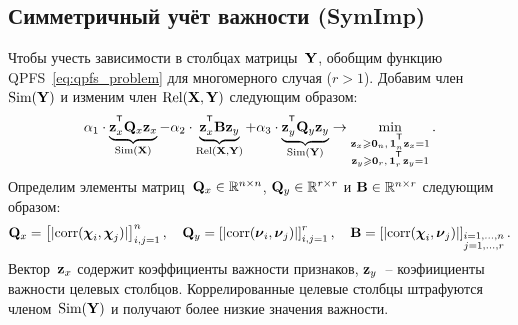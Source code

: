 \subsection{Симметричный учёт важности (SymImp)}
Чтобы учесть зависимости в столбцах матрицы~$\mathbf{Y}$, обобщим функцию QPFS~\eqref{eq:qpfs_problem} для многомерного случая ($r > 1$).
Добавим член~$\text{Sim}(\mathbf{Y})$ и изменим член $\text{Rel}(\mathbf{X}, \mathbf{Y})$ следующим образом:
\begin{equation}
\alpha_1 \cdot \underbrace{\bz_x^{\T} \bQ_x \bz_x}_{\text{Sim}(\bX)} - \alpha_2 \cdot \underbrace{\bz_x^{\T} \bB \bz_y}_{\text{Rel}(\bX, \bY)} + \alpha_3 \cdot \underbrace{\bz_y^{\T} \bQ_y \bz_y}_{\text{Sim}(\bY)} \rightarrow \min_{\substack{\bz_x \geq \bZero_n, \, \bOne_n^{\T}\bz_x=1 \\ \bz_y \geq \bZero_r, \, \bOne_r^{\T}\bz_y=1}}.
\label{eq:symimp}
\end{equation}
Определим элементы матриц~$\mathbf{Q}_x \in \mathbb{R}^{n \times n}$, $\mathbf{Q}_y \in \mathbb{R}^{r \times r}$ и $\mathbf{B} \in \mathbb{R}^{n \times r}$ следующим образом:
\begin{equation*}
\mathbf{Q}_x = \left[ |\text{corr}(\boldsymbol{\chi}_i, \boldsymbol{\chi}_j)| \right]_{i,j=1}^n, \quad
\mathbf{Q}_y = \left[ |\text{corr}(\boldsymbol{\nu}_i, \boldsymbol{\nu}_j)| \right]_{i,j=1}^r, \quad
\mathbf{B} =  \left[ |\text{corr}(\boldsymbol{\chi}_i, \boldsymbol{\nu}_j)| \right]_{\substack{i=1, \dots, n \\ j=1, \dots, r}}.
\end{equation*}
Вектор~$\mathbf{z}_x$ содержит коэффициенты важности признаков, $\mathbf{z}_y$~-- коэфиициенты важности целевых столбцов.
Коррелированные целевые столбцы штрафуются членом~$\text{Sim}(\mathbf{Y})$ и получают более низкие значения важности.

